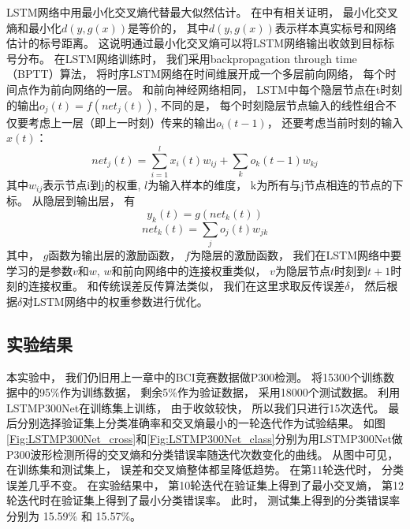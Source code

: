 LSTM网络中用最小化交叉熵代替最大似然估计。 在\cite{erdogmus2002error}中有相关证明， 最小化交叉熵和最小化$d(y, g(x))$是等价的， 其中$d(y, g(x))$表示样本真实标号和网络估计的标号距离。 这说明通过最小化交叉熵可以将LSTM网络输出收敛到目标标号分布。 在LSTM网络训练时， 我们采用backpropagation through time（BPTT）算法\cite{williams1990efficient}， 将时序LSTM网络在时间维展开成一个多层前向网络， 每个时间点作为前向网络的一层。
和前向神经网络相同， LSTM中每个隐层节点在t时刻的输出$o_j(t)=f(net_j(t))$, 不同的是， 每个时刻隐层节点输入的线性组合不仅要考虑上一层（即上一时刻）传来的输出$o_i(t-1)$， 还要考虑当前时刻的输入$x(t)$：
\begin{equation}
	net_j(t)=\sum_{i=1}^{l}x_i(t)w_{ij} + \sum_k{o_k(t-1)w_{kj}}
\end{equation}
其中$w_{ij}$表示节点i到j的权重, $l$为输入样本的维度， k为所有与j节点相连的节点的下标。 从隐层到输出层， 有
\begin{equation}
	y_k(t) = g(net_k(t))
\end{equation}
\begin{equation}
	net_k(t) = \sum_j o_j(t)w_{jk}
\end{equation}
其中， $g$函数为输出层的激励函数， $f$为隐层的激励函数， 我们在LSTM网络中要学习的是参数$v$和$w$, $w$和前向网络中的连接权重类似， $v$为隐层节点$t$时刻到$t+1$时刻的连接权重。 和传统误差反传算法类似， 我们在这里求取反传误差$\delta$， 然后根据$\delta$对LSTM网络中的权重参数进行优化。


\subsection{实验结果}

本实验中， 我们仍旧用上一章中的BCI竞赛数据做P300检测。 将15300个训练数据中的95\%作为训练数据， 剩余5\%作为验证数据， 采用18000个测试数据。 利用LSTMP300Net在训练集上训练， 由于收敛较快， 所以我们只进行15次迭代。 最后分别选择验证集上分类准确率和交叉熵最小的一轮迭代作为试验结果。 如图\ref{Fig:LSTMP300Net_cross}和\ref{Fig:LSTMP300Net_class}分别为用LSTMP300Net做P300波形检测所得的交叉熵和分类错误率随迭代次数变化的曲线。 从图中可见， 在训练集和测试集上， 误差和交叉熵整体都呈降低趋势。 在第11轮迭代时， 分类误差几乎不变。 在实验结果中， 第10轮迭代在验证集上得到了最小交叉熵， 第12轮迭代时在验证集上得到了最小分类错误率。 此时， 测试集上得到的分类错误率分别为 15.59\% 和 15.57\%。

